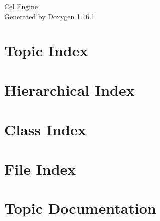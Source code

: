 \documentclass[twoside]{book}
\newcommand{\+}{\discretionary{\mbox{\scriptsize$\hookleftarrow$}}{}{}}
\newcommand{\clearemptydoublepage}{%
    \newpage{\pagestyle{empty}\cleardoublepage}%
  }
\begin{document}
  \raggedbottom
    \hypersetup{pageanchor=false,
                bookmarksnumbered=true,
                pdfencoding=unicode
               }
  \begin{titlepage}
  \vspace*{7cm}
  \begin{center}%
  {\Large Cel Engine}\\
  \vspace*{1cm}
  {\large Generated by Doxygen 1.16.1}\\
  \end{center}
  \end{titlepage}
  \clearemptydoublepage
  \tableofcontents
  \clearemptydoublepage
  \hypersetup{pageanchor=true}
\chapter{Topic Index}

\chapter{Hierarchical Index}

\chapter{Class Index}

\chapter{File Index}

\chapter{Topic Documentation}

\end{document}
